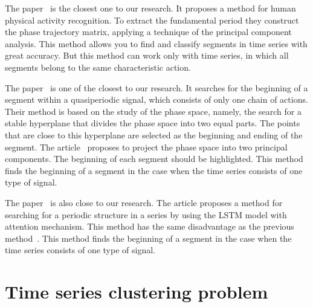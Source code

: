 \documentclass[12pt, twoside]{article}
\numberwithin{equation}{section}
\begin{document}
The paper~\cite{Ignatov2015} is the closest one to our research.
It proposes a method for human physical activity recognition.
To extract the fundamental period they construct the phase trajectory matrix, applying a technique of the principal component analysis. 
This method allows you to find and classify segments in time series with great accuracy. But this method can work only with time series, in which all segments belong to the same characteristic action.

The paper~\cite{motrenko2015} is one of the closest to our research.
It searches for the beginning of a segment within a quasiperiodic signal, which consists of only one chain of actions.
Their method is based on the study of the phase space, namely, the search for a stable hyperplane that divides the phase space into two equal parts.
The points that are close to this hyperplane are selected as the beginning and ending of the segment.
The article~\cite{motrenko2015} proposes to project the phase space into two principal components. The beginning of each segment should be highlighted.
This method finds the beginning of a segment in the case when the time series consists of one type of signal.

The paper~\cite{cinar2018} is also close to our research. 
The article proposes a method for searching for a periodic structure in a series by using the LSTM model with attention mechanism.
This method has the same disadvantage as the previous method~\cite{motrenko2015}. This method finds the beginning of a segment in the case when the time series consists of one type of signal.


\section{Time series clustering problem}
\end{document}

